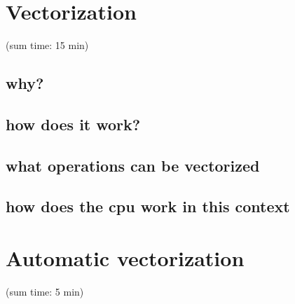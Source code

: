 \documentclass[12pt,titlepage]{article}
\begin{document}
%
\tableofcontents
\clearpage
\section{Vectorization}(sum time: 15 min)
\subsection { why? }
\subsection { how does it work?} 
\subsection{what operations can be vectorized}
\subsection{how does the cpu work in this context}
\section{Automatic vectorization}(sum time:  5 min)
\end{document}
